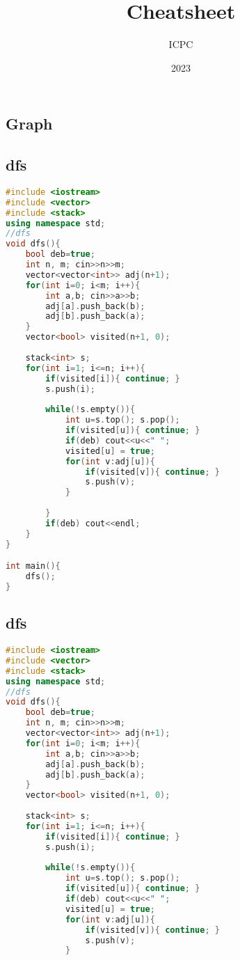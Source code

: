 \documentclass{article}
\title{Cheatsheet}
\date{2023}
\author{ICPC}
\begin{document}
\maketitle
\begin{multicols}{2}\section{Graph}
\subsection{dfs}
\begin{lstlisting}[linewidth=\columnwidth,breaklines=true,language=C++]
#include <iostream>
#include <vector>
#include <stack>
using namespace std;
//dfs
void dfs(){
    bool deb=true;
    int n, m; cin>>n>>m;
    vector<vector<int>> adj(n+1);
    for(int i=0; i<m; i++){
        int a,b; cin>>a>>b;
        adj[a].push_back(b);
        adj[b].push_back(a);
    }
    vector<bool> visited(n+1, 0);
    
    stack<int> s;
    for(int i=1; i<=n; i++){
        if(visited[i]){ continue; }
        s.push(i);
        
        while(!s.empty()){
            int u=s.top(); s.pop();
            if(visited[u]){ continue; }
            if(deb) cout<<u<<" ";
            visited[u] = true;
            for(int v:adj[u]){
                if(visited[v]){ continue; }
                s.push(v);
            }
            
        }
        if(deb) cout<<endl;
    }
}

int main(){
    dfs();
}
\end{lstlisting}
\subsection{dfs}
\begin{lstlisting}[linewidth=\columnwidth,breaklines=true,language=C++]
#include <iostream>
#include <vector>
#include <stack>
using namespace std;
//dfs
void dfs(){
    bool deb=true;
    int n, m; cin>>n>>m;
    vector<vector<int>> adj(n+1);
    for(int i=0; i<m; i++){
        int a,b; cin>>a>>b;
        adj[a].push_back(b);
        adj[b].push_back(a);
    }
    vector<bool> visited(n+1, 0);
    
    stack<int> s;
    for(int i=1; i<=n; i++){
        if(visited[i]){ continue; }
        s.push(i);
        
        while(!s.empty()){
            int u=s.top(); s.pop();
            if(visited[u]){ continue; }
            if(deb) cout<<u<<" ";
            visited[u] = true;
            for(int v:adj[u]){
                if(visited[v]){ continue; }
                s.push(v);
            }
            

\end{lstlisting}
\end{multicols}
\end{document}
